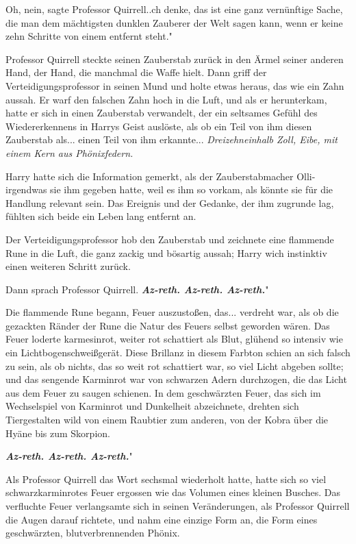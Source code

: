 \glqq Oh, nein\grqq{}, sagte Professor Quirrell.\grqq{}.ch denke, das ist eine
ganz vernünftige Sache, die man dem mächtigsten dunklen Zauberer der Welt sagen
kann, wenn er keine zehn Schritte von einem entfernt steht."

Professor Quirrell steckte seinen Zauberstab zurück in den Ärmel seiner anderen
Hand, der Hand, die manchmal die Waffe hielt. Dann griff der
Verteidigungsprofessor in seinen Mund und holte etwas heraus, das wie ein Zahn
aussah. Er warf den falschen Zahn hoch in die Luft, und als er herunterkam,
hatte er sich in einen Zauberstab verwandelt, der ein seltsames Gefühl des
Wiedererkennens in Harrys Geist auslöste, als ob ein Teil von ihm diesen
Zauberstab als... einen Teil von ihm erkannte... \emph{Dreizehneinhalb Zoll,
Eibe, mit einem Kern aus Phönixfedern. }

Harry hatte sich die Information gemerkt, als der Zauberstabmacher
Olli-irgendwas sie ihm gegeben hatte, weil es ihm so vorkam, als könnte sie für
die Handlung relevant sein. Das Ereignis und der Gedanke, der ihm zugrunde lag,
fühlten sich beide ein Leben lang entfernt an.

Der Verteidigungsprofessor hob den Zauberstab und zeichnete eine flammende Rune
in die Luft, die ganz zackig und bösartig aussah; Harry wich instinktiv einen
weiteren Schritt zurück.

Dann sprach Professor Quirrell. \glqq \textbf{\emph{Az-reth. Az-reth.
Az-reth.}}"

Die flammende Rune begann, Feuer auszustoßen, das... verdreht war, als ob die
gezackten Ränder der Rune die Natur des Feuers selbst geworden wären. Das Feuer
loderte karmesinrot, weiter rot schattiert als Blut, glühend so intensiv wie ein
Lichtbogenschweißgerät. Diese Brillanz in diesem Farbton schien an sich falsch
zu sein, als ob nichts, das so weit rot schattiert war, so viel Licht abgeben
sollte; und das sengende Karminrot war von schwarzen Adern durchzogen, die das
Licht aus dem Feuer zu saugen schienen. In dem geschwärzten Feuer, das sich im
Wechselspiel von Karminrot und Dunkelheit abzeichnete, drehten sich
Tiergestalten wild von einem Raubtier zum anderen, von der Kobra über die Hyäne
bis zum Skorpion.

\glqq \textbf{\emph{Az-reth. Az-reth. Az-reth.}}"

Als Professor Quirrell das Wort sechsmal wiederholt hatte, hatte sich so viel
schwarzkarminrotes Feuer ergossen wie das Volumen eines kleinen Busches. Das
verfluchte Feuer verlangsamte sich in seinen Veränderungen, als Professor
Quirrell die Augen darauf richtete, und nahm eine einzige Form an, die Form
eines geschwärzten, blutverbrennenden Phönix.

